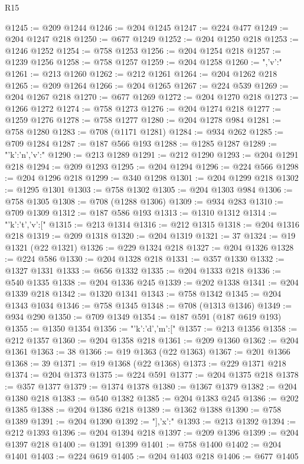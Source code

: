 \begin{lexlean}{R15}
\begin{coremodule}
{{{@1245 := @209 @1244
@1246 := @204 @1245
@1247 := @224 @477
@1249 := @204 @1247 @218
@1250 := @677 @1249
@1252 := @204 @1250 @218
@1253 := @1246 @1252
@1254 := @758 @1253
@1256 := @204 @1254 @218
@1257 := @1239 @1256
@1258 := @758 @1257
@1259 := @204 @1258
@1260 := ",'v':"
@1261 := @213 @1260
@1262 := @212 @1261
@1264 := @204 @1262 @218
@1265 := @209 @1264
@1266 := @204 @1265
@1267 := @224 @539
@1269 := @204 @1267 @218
@1270 := @677 @1269
@1272 := @204 @1270 @218
@1273 := @1266 @1272
@1274 := @758 @1273
@1276 := @204 @1274 @218
@1277 := @1259 @1276
@1278 := @758 @1277
@1280 := @204 @1278 @984
@1281 := @758 @1280
@1283 := @708 (@1171 @1281)
@1284 := @934 @262
@1285 := @709 @1284
@1287 := @187 @566 @193
@1288 := @1285 @1287
@1289 := "{'k':'n','v':"
@1290 := @213 @1289
@1291 := @212 @1290
@1293 := @204 @1291 @218
@1294 := @209 @1293
@1295 := @204 @1294
@1296 := @224 @566
@1298 := @204 @1296 @218
@1299 := @340 @1298
@1301 := @204 @1299 @218
@1302 := @1295 @1301
@1303 := @758 @1302
@1305 := @204 @1303 @984
@1306 := @758 @1305
@1308 := @708 (@1288 @1306)
@1309 := @934 @283
@1310 := @709 @1309
@1312 := @187 @586 @193
@1313 := @1310 @1312
@1314 := "{'k':'t','v':["
@1315 := @213 @1314
@1316 := @212 @1315
@1318 := @204 @1316 @218
@1319 := @209 @1318
@1320 := @204 @1319
@1321 := 37
@1324 := @19 @1321 (@22 @1321)
@1326 := @229 @1324 @218
@1327 := @204 @1326
@1328 := @224 @586
@1330 := @204 @1328 @218
@1331 := @357 @1330
@1332 := @1327 @1331
@1333 := @656 @1332
@1335 := @204 @1333 @218
@1336 := @540 @1335
@1338 := @204 @1336 @245
@1339 := @202 @1338
@1341 := @204 @1339 @218
@1342 := @1320 @1341
@1343 := @758 @1342
@1345 := @204 @1343 @1034
@1346 := @758 @1345
@1348 := @708 (@1313 @1346)
@1349 := @934 @290
@1350 := @709 @1349
@1354 := @187 @591 (@187 @619 @193)
@1355 := @1350 @1354
@1356 := "{'k':'d','m':["
@1357 := @213 @1356
@1358 := @212 @1357
@1360 := @204 @1358 @218
@1361 := @209 @1360
@1362 := @204 @1361
@1363 := 38
@1366 := @19 @1363 (@22 @1363)
@1367 := @201 @1366
@1368 := 39
@1371 := @19 @1368 (@22 @1368)
@1373 := @229 @1371 @218
@1374 := @204 @1373
@1375 := @224 @591
@1377 := @204 @1375 @218
@1378 := @357 @1377
@1379 := @1374 @1378
@1380 := @1367 @1379
@1382 := @204 @1380 @218
@1383 := @540 @1382
@1385 := @204 @1383 @245
@1386 := @202 @1385
@1388 := @204 @1386 @218
@1389 := @1362 @1388
@1390 := @758 @1389
@1391 := @204 @1390
@1392 := "],'x':"
@1393 := @213 @1392
@1394 := @212 @1393
@1396 := @204 @1394 @218
@1397 := @209 @1396
@1399 := @204 @1397 @218
@1400 := @1391 @1399
@1401 := @758 @1400
@1402 := @204 @1401
@1403 := @224 @619
@1405 := @204 @1403 @218
@1406 := @677 @1405
}}}}}}
\end{coremodule}
\end{lexlean}
